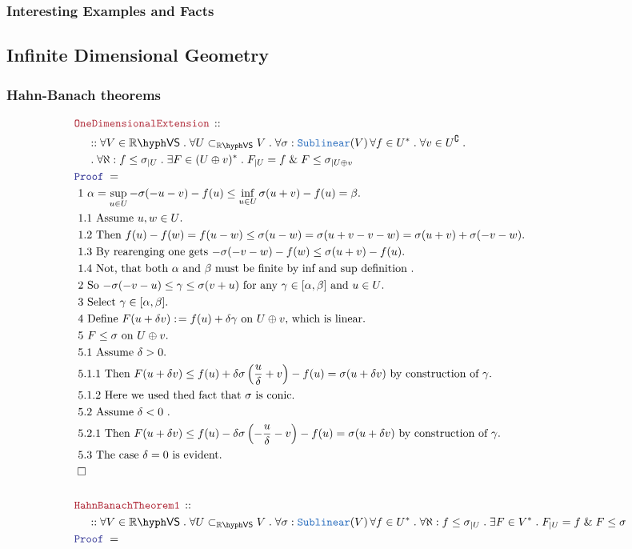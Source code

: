 \documentclass[12pt]{scrartcl}
\newcommand{\TYPE}[1]{\textcolor{NavyBlue}{\mathtt{#1}}}
\newcommand{\LOGIC}[1]{\textcolor{Blue}{\mathtt{#1}}}
\newcommand{\THM}[1]{\textcolor{Maroon}{\mathtt{#1}}}
\renewcommand{\.}{\; . \;}
\newcommand{\de}{: \kern 0.1pc =}
\newcommand{\Theorem}[2]{& \THM{#1} \, :: \, #2 \\ & \Proof = \\ }
\newcommand{\NewLine}{\\ & \kern 1pc}
\newcommand{\Page}[1]{ \begin{align*} #1 \end{align*}   }
\newcommand{\Explain}[1]{& \text{#1.} \\}
\renewcommand{\And}{\; \& \;}
\newcommand{\Reals}{\mathbb{R} }
\renewcommand{\c}{\complement}
\newcommand{\QED}{\; \square}
\newcommand{\EndProof}{& \QED \\}
\newcommand{\Proof}{\LOGIC{Proof} \; }
\newcommand{\subvec}[1]{\subset_{\VS{#1}}}%
\newcommand{\VS}[1]{#1\hyph\mathsf{VS}} %
\begin{document}
\subsubsection{Interesting Examples and Facts}
\newpage
\subsection{Infinite Dimensional Geometry}
\subsubsection{Hahn-Banach theorems}
\Page{
	\Theorem{OneDimensionalExtension}
	{
		\NewLine ::		
		\forall V \in \VS{\Reals} \.
		\forall U \subvec{\Reals} V \.
		\forall \sigma : \TYPE{Sublinear}(V) \,
		\forall f \in U^* \.
		\forall v \in U^\c \. \NewLine \.
		\forall \aleph :  f \le \sigma_{|U} \.
		\exists F \in (U \oplus v)^* \.
		F_{|U} = f \And F \le \sigma_{|U \oplus v}
	}
	\Explain{ 1   
		$
			\alpha = \sup_{u \in U}  -\sigma(-u-v) - f(u) \le 
		 	\inf_{u \in U} \sigma(u  +  v) - f(u) = \beta		
		$}
	\Explain{ 1.1 Assume $u,w \in U$}
	\Explain{ 1.2 Then $f(u) - f(w) = f(u - w) \le \sigma(u -w)  =
		\sigma( u + v - v - w) = \sigma(u + v) + \sigma(-v - w)$}
	\Explain{ 1.3 By rearenging one gets
		$
			- \sigma(-v- w) - f(w) \le  \sigma(u + v) - f(u)
		$}
	\Explain{ 1.4 Not, that both $\alpha$ and $\beta$ must be finite by
		inf and sup definition }
	\Explain{ 2 So  $-\sigma(-v-u) \le \gamma \le \sigma(v+u)$
			for any $\gamma \in [\alpha,\beta]$ and $u \in U$}
	\Explain{ 3 Select $\gamma \in [\alpha,\beta]$}
	\Explain{ 4 Define $F(u + \delta v) \de f(u) + \delta \gamma$ on $U \oplus v$, which is linear}
	\Explain{ 5 $F \le \sigma$  on $U \oplus v$}
	\Explain{ 5.1 Assume $\delta > 0$}
	\Explain{ 5.1.1 Then 
			$F(u + \delta v) \le f(u) + \delta\sigma\left( \frac{u}{\delta} + v \right) - f(u) = 
			  \sigma(u + \delta v)$ by construction of $\gamma$}
	\Explain{ 5.1.2 Here we used thed fact that $\sigma$ is conic}
	\Explain{ 5.2 Assume $\delta < 0$  }
	\Explain{ 5.2.1 Then
		$F(u + \delta v) \le f(u)  - \delta\sigma\left( -\frac{u}{\delta} - v \right) - f(u) = 
			  \sigma(u + \delta v)$  by construction of $\gamma$}
	\Explain{ 5.3 The case $\delta = 0$ is evident}
	\EndProof
	\\
	\Theorem{HahnBanachTheorem1}
	{
		\NewLine ::		
		\forall V \in \VS{\Reals} \.
		\forall U \subvec{\Reals} V \.
		\forall \sigma : \TYPE{Sublinear}(V) \,
		\forall f \in U^* \.
		\forall \aleph :  f \le \sigma_{|U} \.
		\exists F \in V^* \.
		F_{|U} = f \And F \le \sigma
}}
\end{document}

